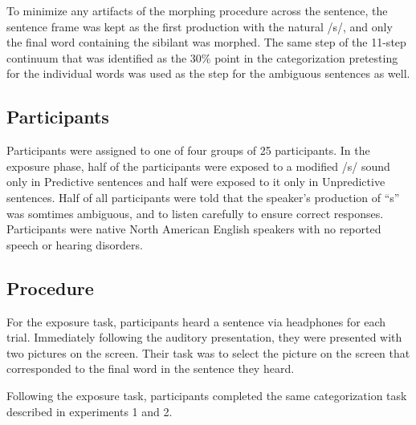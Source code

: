 To minimize any artifacts of the morphing procedure across the sentence, the sentence frame was kept as the first production with the natural /s/, and only the final word containing the sibilant was morphed.  The same step of the 11-step continuum that was identified as the 30\% point in the categorization pretesting for the individual words was used as the step for the ambiguous sentences as well.

\subsection{Participants}

Participants were assigned to one of four groups of 25 participants.  In the exposure phase, half of the participants were exposed to a modified /s/ sound only in Predictive sentences and half were exposed to it only in Unpredictive sentences.  Half of all participants were told that the speaker's production of ``s'' was somtimes ambiguous, and to listen carefully to ensure correct responses.  Participants were native North American English speakers with no reported speech or hearing disorders.

\subsection{Procedure}

For the exposure task, participants heard a sentence via headphones for each trial.  Immediately following the auditory presentation, they were presented with two pictures on the screen.  Their task was to select the picture on the screen that corresponded to the final word in the sentence they heard.

Following the exposure task, participants completed the same categorization task described in experiments 1 and 2.

